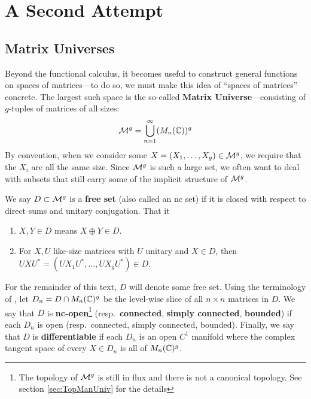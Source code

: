 \chapter{A Second Attempt}\label{ch:SecondAttempt}
\section{Matrix Universes}%
\label{sec:MatUniv}

Beyond the functional calculus, it becomes useful to construct general functions
on spaces of matrices---to do so, we must make this idea of ``spaces of
matrices'' concrete. The largest such space is the so-called \textbf{Matrix
  Universe}---consisting of \(g\)-tuples of matrices of all sizes:
\[
  \mathcal{M}^g = \bigcup_{n=1}^\infty (M_n(\mathbb{C}))^g
\]
By convention, when we consider some
\(X = \left( X_1, \dots , X_g \right) \in \mathcal{M}^g\), we require that the \(X_i\)
are all the same size. Since \(\mathcal{M}^g\) is such a large set, we often want to
deal with subsets that still carry some of the implicit structure of \(\mathcal{M}^g\).
\begin{definition}
  \label{def:FreeSet}
  We say \(D \subset \mathcal{M}^g\) is a \textbf{free set} (also called an nc set) if it is closed with respect
  to direct sums and unitary conjugation. That it
  \begin{enumerate}
    \item \(X,Y \in D \) means \(X\oplus Y \in D\).
    \item For \(X,U\) like-size matrices with \(U\) unitary and \(X \in D\),
          then \(U X U^* = \left( UX_1U^*, \dots , UX_g U^*  \right) \in D \).
  \end{enumerate}
\end{definition}

For the remainder of this text, \(D\) will denote some free set. Using the
terminology of \cite{pascoeFreeNoncommutativePrincipal2020}, let
\(D_n = D \cap M_n(\mathbb{C})^g\) be the level-wise slice of all \(n \times n\)
matrices in \(D\). We say that \(D\) is \textbf{nc-open}\footnote{The topology of \(\mathcal{M}^g\)
  is still in flux and there is not a canonical topology. See section \ref{sec:TopManUniv} for
  the details } (resp.\ \textbf{connected}, \textbf{simply connected}, \textbf{bounded}) if each \(D_n\) is open
(resp.\ connected, simply connected, bounded). Finally, we say that \(D\) is
\textbf{differentiable} if each \(D_n\) is an open \(C^1\) manifold where the
complex tangent space of every \(X \in D_n\) is all of \(M_n(\mathbb{C})^g\).

